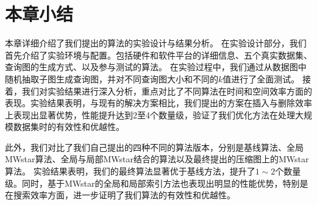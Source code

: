 \section{本章小结}
本章详细介绍了我们提出的算法的实验设计与结果分析。
在实验设计部分，我们首先介绍了实验环境与配置。包括硬件和软件平台的详细信息、五个真实数据集、查询图的生成方式、以及参与测试的算法。
在实验过程中，我们通过从数据图中随机抽取子图生成查询图，并对不同查询图大小和不同的$k$值进行了全面测试。
接着，我们对实验结果进行深入分析，重点对比了不同算法在时间和空间效率方面的表现。实验结果表明，与现有的解决方案相比，我们提出的方案在插入与删除效率上表现出显著优势，性能提升达到2至4个数量级，验证了我们优化方法在处理大规模数据集时的有效性和优越性。

此外，我们对比了我们自己提出的四种不同的算法版本，分别是基线算法、全局MWstar算法、全局与局部MWstar结合的算法以及最终提出的压缩图上的MWstar算法。
实验结果表明，我们的最终算法显著优于基线方法，提升了$1\sim2$个数量级。同时，基于MWstar的全局和局部索引方法也表现出明显的性能优势，特别是在搜索效率方面，进一步证明了我们算法的有效性和优越性。
